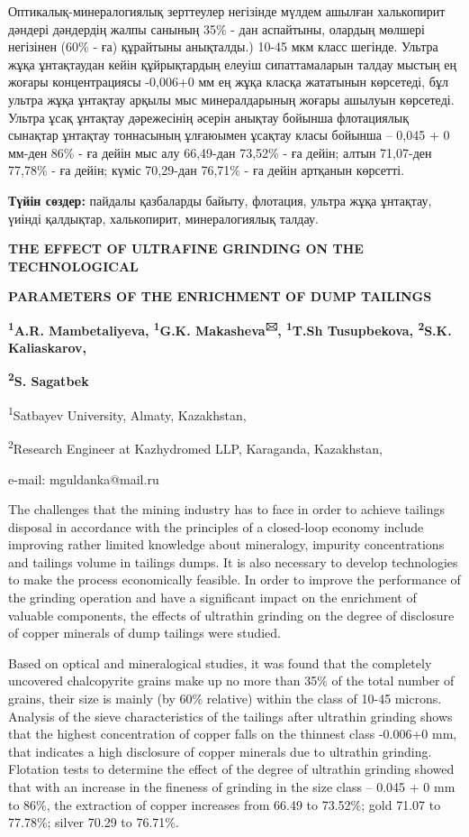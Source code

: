 Оптикалық-минералогиялық зерттеулер негізінде мүлдем ашылған халькопирит
дәндері дәндердің жалпы санының 35\% - дан аспайтыны, олардың мөлшері
негізінен (60\% - ға) құрайтыны анықталды.) 10-45 мкм класс шегінде.
Ультра жұқа ұнтақтаудан кейін құйрықтардың елеуіш сипаттамаларын талдау
мыстың ең жоғары концентрациясы -0,006+0 мм ең жұқа класқа жататынын
көрсетеді, бұл ультра жұқа ұнтақтау арқылы мыс минералдарының жоғары
ашылуын көрсетеді. Ультра ұсақ ұнтақтау дәрежесінің әсерін анықтау
бойынша флотациялық сынақтар ұнтақтау тоннасының ұлғаюымен ұсақтау класы
бойынша -- 0,045 + 0 мм-ден 86\% - ға дейін мыс алу 66,49-дан 73,52\% -
ға дейін; алтын 71,07-ден 77,78\% - ға дейін; күміс 70,29-дан 76,71\% -
ға дейін артқанын көрсетті.

{\bfseries Түйін сөздер:} пайдалы қазбаларды байыту, флотация, ультра жұқа
ұнтақтау, үиінді қалдықтар, халькопирит, минералогиялық талдау.

{\bfseries THE EFFECT OF ULTRAFINE GRINDING ON THE TECHNOLOGICAL}

{\bfseries PARAMETERS OF THE ENRICHMENT OF DUMP TAILINGS}

{\bfseries \textsuperscript{1}A.R. Mambetaliyeva, \textsuperscript{1}G.K.
Makasheva\textsuperscript{🖂}, \textsuperscript{1}T.Sh Tusupbekova,
\textsuperscript{2}S.K. Kaliaskarov,}

{\bfseries \textsuperscript{2}S. Sagatbek}

\textsuperscript{1}Satbayev University, Almaty, Kazakhstan,

\textsuperscript{2}Research Engineer at Kazhydromed LLP, Karaganda,
Kazakhstan,

e-mail: mguldanka@mail.ru

The challenges that the mining industry has to face in order to achieve
tailings disposal in accordance with the principles of a closed-loop
economy include improving rather limited knowledge about mineralogy,
impurity concentrations and tailings volume in tailings dumps. It is
also necessary to develop technologies to make the process economically
feasible. In order to improve the performance of the grinding operation
and have a significant impact on the enrichment of valuable components,
the effects of ultrathin grinding on the degree of disclosure of copper
minerals of dump tailings were studied.

Based on optical and mineralogical studies, it was found that the
completely uncovered chalcopyrite grains make up no more than 35\% of
the total number of grains, their size is mainly (by 60\% relative)
within the class of 10-45 microns. Analysis of the sieve characteristics
of the tailings after ultrathin grinding shows that the highest
concentration of copper falls on the thinnest class -0.006+0 mm, that
indicates a high disclosure of copper minerals due to ultrathin
grinding. Flotation tests to determine the effect of the degree of
ultrathin grinding showed that with an increase in the fineness of
grinding in the size class -- 0.045 + 0 mm to 86\%, the extraction of
copper increases from 66.49 to 73.52\%; gold 71.07 to 77.78\%; silver
70.29 to 76.71\%.

